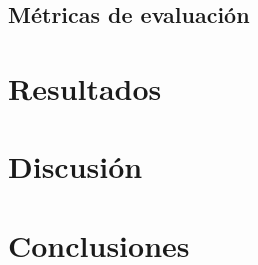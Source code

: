 \documentclass[a4paper, 12pt, print, index, oneside, times, custombib]{PhDThesisPSnPDF}
\begin{document}

\section{Métricas de evaluación}
\label{sec:Métricas}



\chapter{Resultados}
\label{sec:Resultados}


\chapter{Discusión}
\label{sec:Discusión}


\chapter{Conclusiones}
\label{sec:Conclusiones}



	
	
	
	
	
\end{document}
